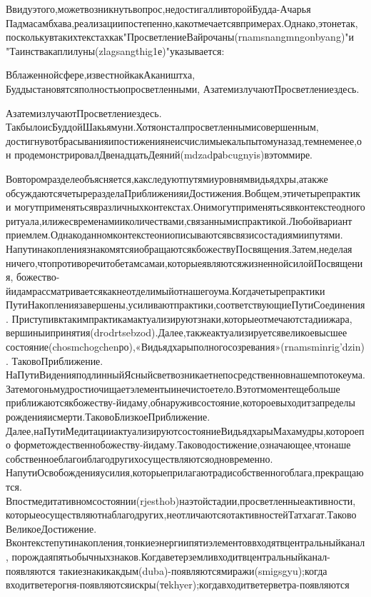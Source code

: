 Ввидуэтого,можетвозникнутьвопрос,недостигалливторойБудда-Ачарья
Падмасамбхава,реализациипостепенно,какотмечаетсявпримерах.Однако,этонетак,
посколькувтакихтекстахкак"ПросветлениеВайрочаны(rnamsnangmngonbyang)"и
"Таинствакаплилуны(zlagsangthig1е)"указывается:

Вблаженнойсфере,известнойкакАкаништха,
Буддыстановятсяполностьюпросветленными,
АзатемизлучаютПросветлениездесь.

АзатемизлучаютПросветлениездесь.
ТакбылоисБуддойШакьямуни.Хотяонсталпросветленнымисовершенным,
достигнувотбрасыванияипостижениянеисчислимыекальпытомуназад,темнеменее,он
продемонстрировалДвенадцатьДеяний(mdzadраbcugnyis)вэтоммире.

Вовторомразделеобъясняется,какследуютпутямиуровнямвидьядхры,атакже
обсуждаютсячетыреразделаПриближенияиДостижения.Вобщем,этичетырепрактики
могутприменятьсявразличныхконтекстах.Онимогутприменятьсявконтекстеодного
ритуала,илижесвременамииколичествами,связаннымиспрактикой.Любойвариант
приемлем.Однакоданномконтекстеониописываютсявсвязисостадиямиипутями.
НапутинакоплениязнакомятсяиобращаютсякбожествуПосвящения.Затем,неделая
ничего,чтопротиворечитобетамсамаи,которыеявляютсяжизненнойсилойПосвящения,
божество-йидамрассматриваетсякакнеотделимыйотнашегоума.Когдачетырепрактики
ПутиНакоплениязавершены,усиливаютпрактики,соответствующиеПутиСоединения.
Приступивктакимпрактикамактуализируютзнаки,которыеотмечаютстадиижара,
вершиныипринятия(drodrtsebzod).Далее,такжеактуализируетсявеликоевысшее
состояние(chosmchogchenро),«Видьядхарыполногосозревания»(rnamsminrig'dzin).
ТаковоПриближение.
НаПутиВиденияподлинныйЯсныйсветвозникаетнепосредственновнашемпотокеума.
Затемогоньмудростиочищаетэлементыинечистоетело.Вэтотмоментещебольше
приближаютсякбожеству-йидаму,обнаруживсостояние,котороевыходитзапределы
рожденияисмерти.ТаковоБлизкоеПриближение.
Далее,наПутиМедитацииактуализируютсостояниеВидьядхарыМахамудры,котороепо
форметождественнобожеству-йидаму.Таководостижение,означающее,чтонаше
собственноеблагоиблагодругихосуществляютсяодновременно.
НапутиОсвобожденияусилия,которыеприлагаютрадисобственногоблага,прекращаются.
Впостмедитативномсостоянии(rjesthob)наэтойстадии,просветленныеактивности,
которыеосуществляютнаблагодругих,неотличаютсяотактивностейТатхагат.Таково
ВеликоеДостижение.
Вконтекстепутинакопления,тонкиеэнергиипятиэлементоввходятвцентральныйканал,
порождаяпятьобычныхзнаков.Когдаветерземливходитвцентральныйканал-появляются
такиезнакикакдым(duba)-появляютсямиражи(smigsgyu);когда
входитветерогня-появляютсяискры(теkhyer);когдавходитветерветра-появляются
